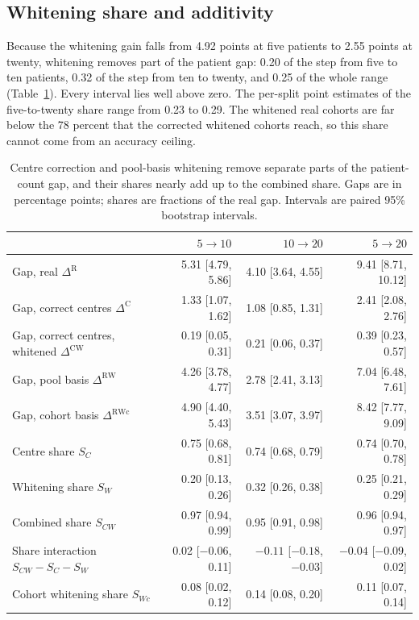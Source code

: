 \documentclass[11pt]{article}
\begin{document}
\subsection{Whitening share and additivity}
\label{sec:additivity}
Because the whitening gain falls from 4.92 points at five patients to 2.55 points at twenty, whitening removes part of the patient gap: 0.20 of the step from five to ten patients, 0.32 of the step from ten to twenty, and 0.25 of the whole range (Table~\ref{tab:shares}). Every interval lies well above zero. The per-split point estimates of the five-to-twenty share range from 0.23 to 0.29. The whitened real cohorts are far below the 78 percent that the corrected whitened cohorts reach, so this share cannot come from an accuracy ceiling.

\begin{table}[htbp]
\centering
\small
\renewcommand{\arraystretch}{1.15}
\begin{tabular}{@{}lrrr@{}}
\toprule
 & $5\to10$ & $10\to20$ & $5\to20$ \\
\midrule
Gap, real $\Delta^{\mathrm R}$ & 5.31 [4.79, 5.86] & 4.10 [3.64, 4.55] & 9.41 [8.71, 10.12] \\
Gap, correct centres $\Delta^{\mathrm C}$ & 1.33 [1.07, 1.62] & 1.08 [0.85, 1.31] & 2.41 [2.08, 2.76] \\
Gap, correct centres, whitened $\Delta^{\mathrm{CW}}$ & 0.19 [0.05, 0.31] & 0.21 [0.06, 0.37] & 0.39 [0.23, 0.57] \\
Gap, pool basis $\Delta^{\mathrm{RW}}$ & 4.26 [3.78, 4.77] & 2.78 [2.41, 3.13] & 7.04 [6.48, 7.61] \\
Gap, cohort basis $\Delta^{\mathrm{RWc}}$ & 4.90 [4.40, 5.43] & 3.51 [3.07, 3.97] & 8.42 [7.77, 9.09] \\
\addlinespace
Centre share $S_C$ & 0.75 [0.68, 0.81] & 0.74 [0.68, 0.79] & 0.74 [0.70, 0.78] \\
Whitening share $S_W$ & 0.20 [0.13, 0.26] & 0.32 [0.26, 0.38] & 0.25 [0.21, 0.29] \\
Combined share $S_{CW}$ & 0.97 [0.94, 0.99] & 0.95 [0.91, 0.98] & 0.96 [0.94, 0.97] \\
Share interaction $S_{CW}-S_C-S_W$ & 0.02 [$-0.06$, 0.11] & $-0.11$ [$-0.18$, $-0.03$] & $-0.04$ [$-0.09$, 0.02] \\
Cohort whitening share $S_{Wc}$ & 0.08 [0.02, 0.12] & 0.14 [0.08, 0.20] & 0.11 [0.07, 0.14] \\
\bottomrule
\end{tabular}
\caption{Centre correction and pool-basis whitening remove separate parts of the patient-count gap, and their shares nearly add up to the combined share. Gaps are in percentage points; shares are fractions of the real gap. Intervals are paired 95\% bootstrap intervals.}
\label{tab:shares}
\end{table}
\end{document}
